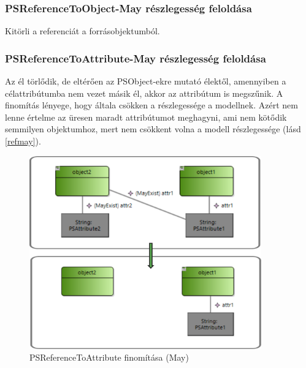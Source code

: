 \subsubsection{PSReferenceToObject-May részlegesség feloldása}
Kitörli a referenciát a forrásobjektumból.

\subsubsection{PSReferenceToAttribute-May részlegesség feloldása}
Az él törlődik, de eltérően az PSObject-ekre mutató élektől, amennyiben a célattribútumba nem vezet másik él, akkor az attribútum is megszűnik. A finomítás lényege, hogy általa csökken a részlegessége a modellnek. Azért nem lenne értelme az üresen maradt attribútumot meghagyni, ami nem kötődik semmilyen objektumhoz, mert nem csökkent volna a modell részlegessége (lásd \autoref{refmay}).
\begin{figure}[!ht]
	\centering
	\includegraphics[width=100mm]{figures/refmay.pdf}
	\caption{PSReferenceToAttribute finomítása (May)}
	\label{refmay} 
\end{figure}

